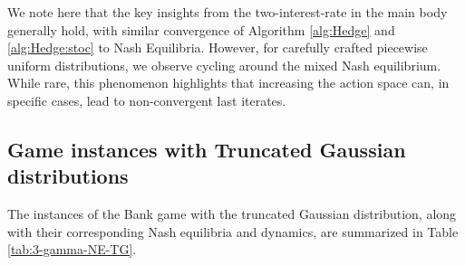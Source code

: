 We note here that the key insights from the two-interest-rate in the main body generally hold, with similar convergence of Algorithm \ref{alg:Hedge} and \ref{alg:Hedge:stoc} to Nash Equilibria. However, for carefully crafted piecewise uniform distributions, we observe cycling around the mixed Nash equilibrium. While rare, this phenomenon highlights that increasing the action space can, in specific cases, lead to non-convergent last iterates.

\subsection{Game instances with Truncated Gaussian distributions}
\label{app:3-gam-truncgauss}

The instances of the Bank game with the truncated Gaussian distribution, along with their corresponding Nash 
equilibria and dynamics, are summarized in Table \ref{tab:3-gamma-NE-TG}.

\vspace*{-11pt} %

